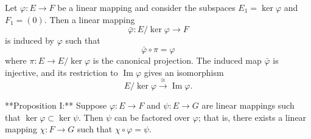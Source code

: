 Let $\varphi: E \to F$ be a linear mapping and consider the subspaces $E_1 = \ker \varphi$ and $F_1 = (0)$. Then a linear mapping
$$\bar{\varphi}: E / \ker \varphi \to F$$
is induced by $\varphi$ such that
$$\bar{\varphi} \circ \pi = \varphi$$
where $\pi: E \to E / \ker \varphi$ is the canonical projection. The induced map $\bar{\varphi}$ is injective, and its restriction to $\operatorname{Im} \varphi$ gives an isomorphism
$$E / \ker \varphi \xrightarrow{\cong} \operatorname{Im} \varphi.$$

**Proposition I:** Suppose $\varphi: E \to F$ and $\psi: E \to G$ are linear mappings such that $\ker \varphi \subset \ker \psi$. Then $\psi$ can be factored over $\varphi$; that is, there exists a linear mapping $\chi: F \to G$ such that $\chi \circ \varphi = \psi$.
